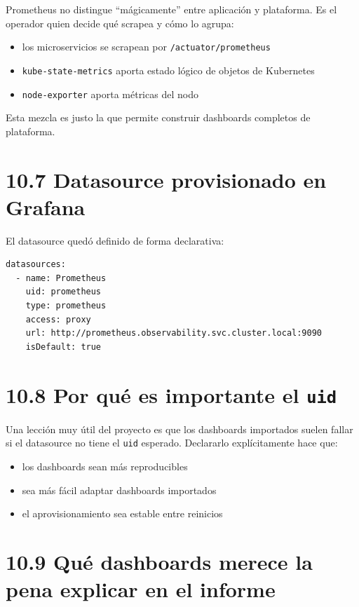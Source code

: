\documentclass[
a4paper,
12pt]{report}
\providecommand{\tightlist}{%
  \setlength{\itemsep}{0pt}\setlength{\parskip}{0pt}}
\begin{document}
Prometheus no distingue ``mágicamente'' entre aplicación y plataforma.
Es el operador quien decide qué scrapea y cómo lo agrupa:

\begin{itemize}
\tightlist
\item
  los microservicios se scrapean por \texttt{/actuator/prometheus}
\item
  \texttt{kube-state-metrics} aporta estado lógico de objetos de
  Kubernetes
\item
  \texttt{node-exporter} aporta métricas del nodo
\end{itemize}

Esta mezcla es justo la que permite construir dashboards completos de
plataforma.

\section{10.7 Datasource provisionado en
Grafana}\label{datasource-provisionado-en-grafana}

El datasource quedó definido de forma declarativa:

\begin{verbatim}
datasources:
  - name: Prometheus
    uid: prometheus
    type: prometheus
    access: proxy
    url: http://prometheus.observability.svc.cluster.local:9090
    isDefault: true
\end{verbatim}

\section{\texorpdfstring{10.8 Por qué es importante el
\texttt{uid}}{10.8 Por qué es importante el uid}}\label{por-quuxe9-es-importante-el-uid}

Una lección muy útil del proyecto es que los dashboards importados
suelen fallar si el datasource no tiene el \texttt{uid} esperado.
Declararlo explícitamente hace que:

\begin{itemize}
\tightlist
\item
  los dashboards sean más reproducibles
\item
  sea más fácil adaptar dashboards importados
\item
  el aprovisionamiento sea estable entre reinicios
\end{itemize}

\section{10.9 Qué dashboards merece la pena explicar en el
informe}\label{quuxe9-dashboards-merece-la-pena-explicar-en-el-informe}
\end{document}
